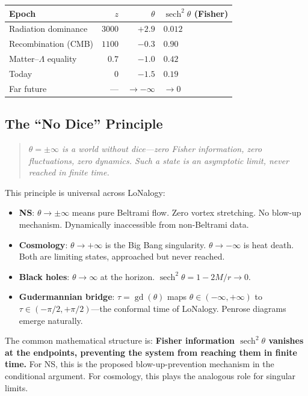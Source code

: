 \documentclass[12pt,a4paper]{article}
\theoremstyle{definition}
\newcommand{\sech}{\operatorname{sech}}
\newcommand{\gd}{\operatorname{gd}}
\begin{document}
\begin{center}
\begin{tabular}{lrrl}
\toprule
\textbf{Epoch} & $z$ & $\theta$ & $\sech^2\theta$ (Fisher) \\
\midrule
Radiation dominance & $3000$ & $+2.9$ & $0.012$ \\
Recombination (CMB) & $1100$ & $-0.3$ & $0.90$ \\
Matter--$\Lambda$ equality & $0.7$ & $-1.0$ & $0.42$ \\
Today & $0$ & $-1.5$ & $0.19$ \\
Far future & --- & $\to -\infty$ & $\to 0$ \\
\bottomrule
\end{tabular}
\end{center}

\subsection{The ``No Dice'' Principle}

\begin{quote}
\emph{$\theta = \pm\infty$ is a world without dice---zero Fisher information, zero fluctuations, zero dynamics. Such a state is an asymptotic limit, never reached in finite time.}
\end{quote}

This principle is universal across LoNalogy:

\begin{itemize}
  \item \textbf{NS}: $\theta \to \pm\infty$ means pure Beltrami flow. Zero vortex stretching. No blow-up mechanism. Dynamically inaccessible from non-Beltrami data.
  \item \textbf{Cosmology}: $\theta \to +\infty$ is the Big Bang singularity. $\theta \to -\infty$ is heat death. Both are limiting states, approached but never reached.
  \item \textbf{Black holes}: $\theta \to \infty$ at the horizon. $\sech^2\theta = 1 - 2M/r \to 0$.
  \item \textbf{Gudermannian bridge}: $\tau = \gd(\theta)$ maps $\theta \in (-\infty, +\infty)$ to $\tau \in (-\pi/2, +\pi/2)$---the conformal time of LoNalogy. Penrose diagrams emerge naturally.
\end{itemize}

The common mathematical structure is: \textbf{Fisher information $\sech^2\theta$ vanishes at the endpoints, preventing the system from reaching them in finite time.} For NS, this is the proposed blow-up-prevention mechanism in the conditional argument. For cosmology, this plays the analogous role for singular limits.
\end{document}
